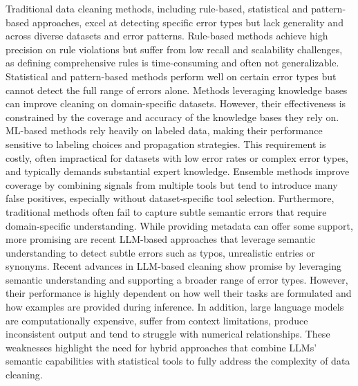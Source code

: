 Traditional data cleaning methods, including rule-based, statistical and pattern-based approaches, excel at detecting specific error types but lack generality and across diverse datasets and error patterns.
Rule-based methods achieve high precision on rule violations but suffer from low recall and scalability challenges, as defining comprehensive rules is time-consuming and often not generalizable. 
Statistical and pattern-based methods perform well on certain error types but cannot detect the full range of errors alone. 
Methods leveraging knowledge bases can improve cleaning on domain-specific datasets. 
However, their effectiveness is constrained by the coverage and accuracy of the knowledge bases they rely on. 
ML-based methods rely heavily on labeled data, making their performance sensitive to labeling choices and propagation strategies. 
This requirement is costly, often impractical for datasets with low error rates or complex error types, and typically demands substantial expert knowledge.
Ensemble methods improve coverage by combining signals from multiple tools but tend to introduce many false positives, especially without dataset-specific tool selection. 
Furthermore, traditional methods often fail to capture subtle semantic errors that require domain-specific understanding.
While providing metadata can offer some support, more promising are recent LLM-based approaches that leverage semantic understanding to detect subtle errors such as typos, unrealistic entries or synonyms. 
\newline\newline
Recent advances in LLM-based cleaning show promise by leveraging semantic understanding and supporting a broader range of error types.
However, their performance is highly dependent on how well their tasks are formulated and how examples are provided during inference. 
In addition, large language models are computationally expensive, suffer from context limitations, produce inconsistent output and tend to struggle with numerical relationships. 
These weaknesses highlight the need for hybrid approaches that combine LLMs' semantic capabilities with statistical tools to fully address the complexity of data cleaning.

